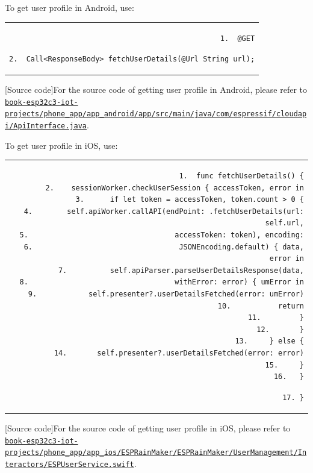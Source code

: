 \documentclass[a4paper,12pt,openany]{book}
\renewcommand{\ttfamily}{\fontfamily{pcr}\selectfont}
\renewcommand{\arraystretch}{1}
\newenvironment{codebloc}{ %
    \ttfamily\footnotesize
    \renewcommand{\arraystretch}{1}
}
\newcommand{\note}[2][NOTE]{ %
\vspace{6pt}
\begin{tabular}{b{\textwidth}}
\hline
\fontfamily{phv}\selectfont \textbf{#1}\\
\leftskip 1em #2\\
\hline
\end{tabular}
}
\begin{document}
To get user profile in Android, use:

\begin{codebloc}
\begin{tabular}{d}
\verb|1.  @GET|

\verb|2.  Call<ResponseBody> fetchUserDetails(@Url String url);|
\end{tabular}
\end{codebloc}

\note[Source code]{For the source code of getting user profile in Android, please refer to \href{https://github.com/espressif/book-esp32c3-iot-projects/blob/main/phone_app/app_android/app/src/main/java/com/espressif/cloudapi/ApiInterface.java}{\texttt{book-esp32c3-\newline iot-projects/phone\_app/app\_android/app/src/main/java/com/\newline espressif/cloudapi/ApiInterface.java}}.}

To get user profile in iOS, use:

\begin{codebloc}
\begin{tabular}{d}
\vspace{2pt}
\begin{verbatim}
1.  func fetchUserDetails() {
2.    sessionWorker.checkUserSession { accessToken, error in
3.      if let token = accessToken, token.count > 0 {
4.        self.apiWorker.callAPI(endPoint: .fetchUserDetails(url: self.url,
5.                                  accessToken: token), encoding:
6.                                  JSONEncoding.default) { data, error in
7.          self.apiParser.parseUserDetailsResponse(data,
8.                                  withError: error) { umError in
9.            self.presenter?.userDetailsFetched(error: umError)
10.           return
11.         }
12.       }
13.     } else {
14.       self.presenter?.userDetailsFetched(error: error)
15.     }
16.   }
\end{verbatim}
\verb|17. }|
\end{tabular}
\end{codebloc}

\note[Source code]{For the source code of getting user profile in iOS, please refer to \href{https://github.com/espressif/book-esp32c3-iot-projects/blob/main/phone_app/app_ios/ESPRainMaker/ESPRainMaker/UserManagement/Interactors/ESPUserService.swift}{\texttt{book-esp32c3-\newline iot-projects/phone\_app/app\_ios/ESPRainMaker/ESPRainMaker/\newline UserManagement/Interactors/ESPUserService.swift}}.}
\end{document}
